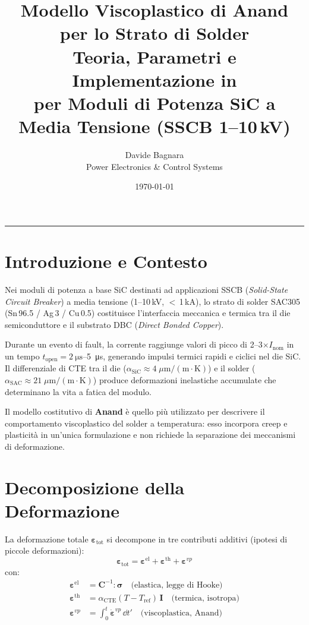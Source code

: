 \documentclass[11pt,a4paper]{article}
\title{%
  \textbf{Modello Viscoplastico di Anand per lo Strato di Solder \sac{}}\\[4pt]
  \large Teoria, Parametri e Implementazione in \comsol{}\\
  \large per Moduli di Potenza SiC a Media Tensione (SSCB 1--10\,kV)
}
\author{Davide Bagnara\\
  \small Power Electronics \& Control Systems
}
\date{\today}
\newcommand{\tens}[1]{\bm{#1}}
\newcommand{\sac}{SAC305}
\begin{document}
\maketitle
\tableofcontents
\bigskip
\hrule
\bigskip

\section{Introduzione e Contesto}

Nei moduli di potenza a base SiC destinati ad applicazioni SSCB (\emph{Solid-State
Circuit Breaker}) a media tensione (1--10\,kV, $<$\,1\,kA), lo strato di solder
\sac{} (Sn\,96.5 / Ag\,3 / Cu\,0.5) costituisce l'interfaccia meccanica e termica
tra il die semiconduttore e il substrato DBC (\emph{Direct Bonded Copper}).

Durante un evento di fault, la corrente raggiunge valori di picco di 2--3$\times
I_{\mathrm{nom}}$ in un tempo $t_{\mathrm{open}} = \SI{2}{\micro\second}$--\SI{5}{\micro\second},
generando impulsi termici rapidi e ciclici nel die SiC. Il differenziale di CTE
tra il die ($\alpha_{\mathrm{SiC}} \approx 4\;\mu\mathrm{m/(m\cdot K)}$) e il solder
($\alpha_{\mathrm{SAC}} \approx 21\;\mu\mathrm{m/(m\cdot K)}$) produce deformazioni
inelastiche accumulate che determinano la vita a fatica del modulo.

Il modello costitutivo di \textbf{Anand} \cite{Anand1985} è quello più utilizzato
per descrivere il comportamento viscoplastico del solder a temperatura: esso
incorpora creep e plasticità in un'unica formulazione e non richiede la separazione
dei meccanismi di deformazione.

\section{Decomposizione della Deformazione}

La deformazione totale $\tens{\varepsilon}_{\mathrm{tot}}$ si decompone in tre
contributi additivi (ipotesi di piccole deformazioni):
%
\begin{equation}
  \tens{\varepsilon}_{\mathrm{tot}}
  = \tens{\varepsilon}^{\mathrm{el}}
  + \tens{\varepsilon}^{\mathrm{th}}
  + \tens{\varepsilon}^{vp}
  \label{eq:decomp}
\end{equation}
%
con:
\begin{align}
  \tens{\varepsilon}^{\mathrm{el}} &= \mathbf{C}^{-1} : \tens{\sigma}
  \quad \text{(elastica, legge di Hooke)} \label{eq:el}\\
  \tens{\varepsilon}^{\mathrm{th}} &= \alpha_{\mathrm{CTE}}(T-T_{\mathrm{ref}})\,\mathbf{I}
  \quad \text{(termica, isotropa)} \label{eq:th}\\
  \tens{\varepsilon}^{vp} &= \int_0^t \dot{\tens{\varepsilon}}^{vp}\,\dd t'
  \quad \text{(viscoplastica, Anand)} \label{eq:vp}
\end{align}
\end{document}
